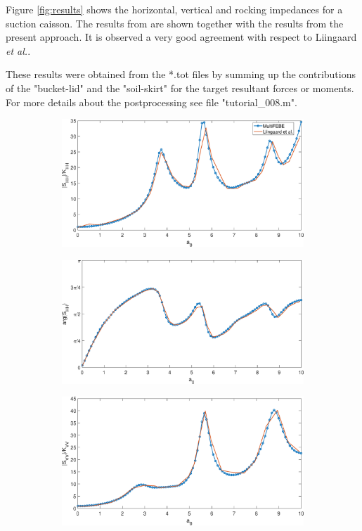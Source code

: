 \documentclass[a4]{article}
\begin{document}
Figure \ref{fig:results} shows the horizontal, vertical and rocking impedances for a suction caisson. The results from \cite{liingaard} are shown together with the results from the present approach. It is observed a very good agreement with respect to Liingaard \textit{et al.}. 

These results were obtained from the *.tot files by summing up the contributions of the "bucket-lid" and the "soil-skirt" for the target resultant forces or moments. For more details about the postprocessing see file "tutorial\_008.m".

\begin{figure}[tbh!]
	\centering
	\begin{subfigure}[b]{0.48\textwidth}
		\centering
		\includegraphics[width=\textwidth]{Shh.eps}
		\label{fig:Shh}
	\end{subfigure}
	\begin{subfigure}[b]{0.48\textwidth}
		\centering
		\includegraphics[width=\textwidth]{arg_Shh.eps}
		\label{fig:arg_Shh}
	\end{subfigure}
	\begin{subfigure}[b]{0.48\textwidth}
		\centering
		\includegraphics[width=\textwidth]{Svv.eps}

\end{subfigure}
\end{figure}
\end{document}
